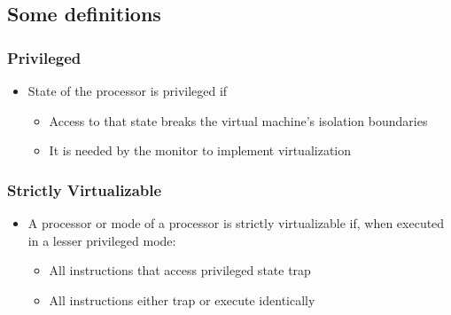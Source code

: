 \documentclass{article}
\begin{document}
\subsection{Some definitions}

\subsubsection{Privileged}
\begin{itemize}
    \item State of the processor is privileged if
    \begin{itemize}
        \item Access to that state breaks the virtual machine’s isolation boundaries
        
        \item It is needed by the monitor to implement virtualization
    \end{itemize}
\end{itemize}

\subsubsection{Strictly Virtualizable}
\begin{itemize}
    \item A processor or mode of a processor is strictly virtualizable if, when executed in a lesser privileged mode:
    \begin{itemize}
        \item All instructions that access privileged state trap
        
        \item All instructions either trap or execute identically
    \end{itemize}
\end{itemize}
\end{document}
